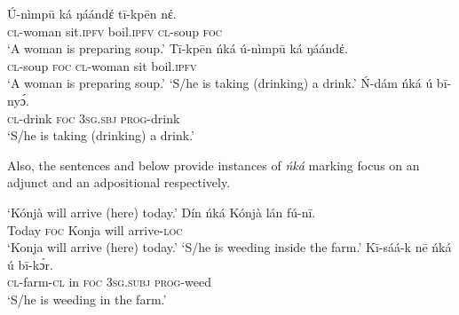 \documentclass[output=paper,colorlinks,citecolor=brown]{langscibook}
\begin{document}
\ea%
    \label{ex:bisilki:13}
    \ea\label{ex:bisilki:13a}
    \gll    Ú-nìmpū	ká		ŋáándέ	tī-kpēn	nέ.\\
            \textsc{cl-}woman	sit\textsc{.ipfv}	boil\textsc{.ipfv}	\textsc{cl-}soup	\textsc{foc}\\
    \glt    ‘A woman is preparing soup.’
    \ex\label{ex:bisilki:13b}
    \gll    Tī-kpēn	ńká	ú-nìmpū	ká	ŋáándέ.\\
            \textsc{cl-}soup	\textsc{foc}	\textsc{cl-}woman	sit	boil\textsc{.ipfv}\\
    \glt    ‘A woman is preparing soup.’
    \jambox*{[canonical]}
    \glt    ‘S/he is taking (drinking) a drink.’
    \ex\label{ex:bisilki:13d}
    \gll    Ń-dám	ńká	ú		bī-nyɔ́.\\
            \textsc{cl-}drink	\textsc{foc}	\textsc{3sg.sbj}	\textsc{prog-}drink\\
    \glt    ‘S/he is taking (drinking) a drink.’
    \z
\z

Also, the sentences  and  below provide instances of \textit{ńká} marking focus on an adjunct and an adpositional respectively.

\ea%
    \label{ex:bisilki:14}
    \jambox*{[canonical]}
    \glt    ‘Kónjà will arrive (here) today.’
    \ex\label{ex:bisilki:14b}
    \gll    Dín		ńká	Kónjà		lán	fú-nī.\\
            Today		\textsc{foc}	Konja		will	arrive-\textsc{loc}\\
    \glt    ‘Konja will arrive (here) today.’
    \glt    ‘S/he is weeding inside the farm.’
    \ex\label{ex:bisilki:14d}
    \gll    Kī-sáá-k	nē	ńká	ú		bī-kɔ́r.\\
            \textsc{cl-}farm\textsc{-cl}	in	\textsc{foc}	\textsc{3sg.subj}	\textsc{prog-}weed\\
    \glt    ‘S/he is weeding in the farm.’
    \z
\z
\end{document}
